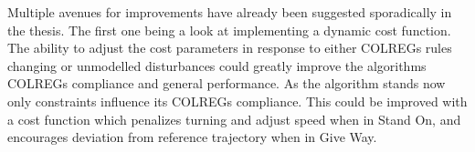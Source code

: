 Multiple avenues for improvements have already been suggested sporadically in the thesis. The first one being a look at implementing a dynamic cost function.
The ability to adjust the cost parameters in response to either COLREGs rules changing or unmodelled disturbances could
greatly improve the algorithms COLREGs compliance and general performance. As the algorithm stands now only constraints influence its COLREGs compliance. This could be improved with a
cost function which penalizes turning and adjust speed when in Stand On, and encourages deviation from reference trajectory when in Give Way.

